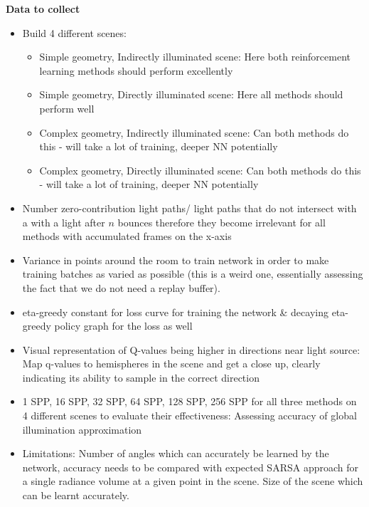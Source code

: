 \documentclass[ %
                    author={Callum Pearce},
                supervisor={Dr. Neill Campbell},
                    degree={MEng},
                     title={How effective are Temporal difference learning methods for reducing the number of zero contribution light paths, while still accurately approximating Global Illumination in Path tracing?},
                  subtitle={},
                      type={research},
                      year={2019} ]{dissertation}
\begin{document}
\textbf{Data to collect}
\begin{itemize}

\item Build 4 different scenes:

\begin{itemize}
\item Simple geometry, Indirectly illuminated scene: Here both reinforcement learning methods should perform excellently

\item Simple geometry, Directly illuminated scene: Here all methods should perform well

\item Complex geometry, Indirectly illuminated scene: Can both methods do this - will take a lot of training, deeper NN potentially

\item Complex geometry, Directly illuminated scene: Can both methods do this - will take a lot of training, deeper NN potentially
\end{itemize}

\item Number zero-contribution light paths/ light paths that do not intersect with a with a light after $n$ bounces therefore they become irrelevant for all methods with accumulated frames on the x-axis

\item Variance in points around the room to train network in order to make training batches as varied as possible (this is a weird one, essentially assessing the fact that we do not need a replay buffer).

\item eta-greedy constant for loss curve for training the network \& decaying eta-greedy policy graph for the loss as well

\item Visual representation of Q-values being higher in directions near light source: Map q-values to hemispheres in the scene and get a close up, clearly indicating its ability to sample in the correct direction

\item 1 SPP, 16 SPP, 32 SPP, 64 SPP, 128 SPP, 256 SPP for all three methods on 4 different scenes to evaluate their effectiveness: Assessing accuracy of global illumination approximation

\item Limitations: Number of angles which can accurately be learned by the network, accuracy  needs to be compared with expected SARSA approach for a single radiance volume at a given point in the scene. Size of the scene which can be learnt accurately.

\end{itemize}
\end{document}
